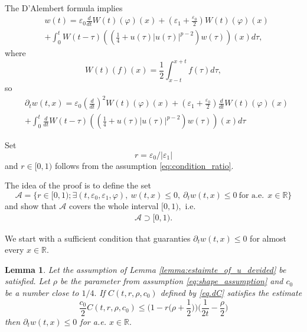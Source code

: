 \documentclass[reqno]{amsart}
\newtheorem{Lemma}[Theorem]{Lemma}
\begin{document}
The D'Alembert formula implies
\begin{align*}
    &w(t) = \varepsilon_0 \frac{d}{dt} W(t) (\varphi)(x) + \left(\varepsilon_1 + \frac{\varepsilon_0}{2} \right) W(t)(\varphi)(x)\\
    &+ \int_0^t W(t-\tau)\left( \left(\frac{1}{4}+u(\tau)|u(\tau)|^{p-2}\right) w(\tau) \right) (x) d\tau,
\end{align*}
where
	\[
	W(t)(f)(x) = \frac{1}{2} \int_{x-t}^{x+t} f(\tau) d\tau,
	\]
so
	\begin{align*}
	&\partial_t w(t,x) =  \varepsilon_0 \left(\frac{d}{dt}\right)^2 W(t) (\varphi)(x) + \left(\varepsilon_1 + \frac{\varepsilon_0}{2} \right) \frac{d}{dt} W(t)(\varphi)(x)\\
	&+ \int_0^t \frac{d}{dt} W(t-\tau)\left( \left(\frac{1}{4}+u(\tau)|u(\tau)|^{p-2}\right) w(\tau) \right) (x) d\tau
	\end{align*}

Set 
	\[
	r = \varepsilon_0/|\varepsilon_1|
	\]
and $r\in [0,1)$ follows from the assumption \eqref{eq:condition_ratio}.

The idea of the proof is to define the set
\begin{equation}\label{eq.dA}
\mathcal{A}
= \{r \in [0,1); \exists (t,\varepsilon_0, \varepsilon_1, \varphi), \  w(t,x) \leq 0,\  \partial_t w(t,x) \leq 0 \ \mbox{for a.e.} \ \  x \in \mathbb{R} \}
\end{equation}
and show that $\mathcal{A}$ covers the whole interval $[0,1),$ i.e.
\begin{equation}\label{Asup}
    \begin{aligned}
        \mathcal{A} \supset [0,1).
    \end{aligned}
\end{equation}

We start with a sufficient condition that guaranties $\partial_t w(t,x) \leq 0$ for almost every $x \in \mathbb{R}.$
\begin{Lemma}
\label{lemma:condition_for_negative_speed}
Let the assumption of Lemma \ref{lemma:estaimte_of_u_devided}
be satisfied.
Let $\rho$ be the parameter from assumption \eqref{eq:shape_assumption}
and $c_0$ be a number close to $1/4.$
If $C(t,r,\rho,c_0)$ defined by \eqref{eq.dC} satisfies the estimate
	\begin{equation}\label{eq.a1}
	\frac{c_0}{2} C(t,r,\rho,c_0)
	\leq \bigg(1 - r \bigg( \rho + \frac{1}{2} \bigg) \bigg) \bigg( \frac{1}{2t} - \frac \rho 2 \bigg)
	\end{equation}
then $\partial_t w(t,x) \leq 0$ for a.e. $x \in \mathbb{R}.$
\end{Lemma}
\end{document}
